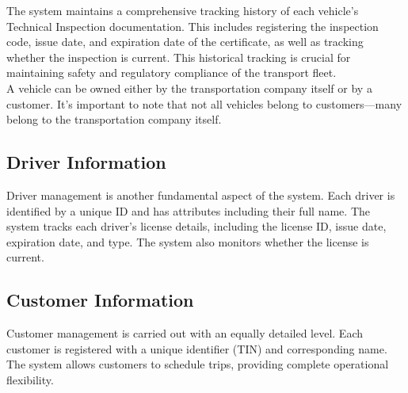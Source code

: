 \documentclass[11pt, a4paper]{article}
\begin{document}
The system maintains a comprehensive tracking history of each vehicle's Technical Inspection documentation. This includes registering the inspection code, issue date, and expiration date of the certificate, as well as tracking whether the inspection is current. This historical tracking is crucial for maintaining safety and regulatory compliance of the transport fleet.\\

A vehicle can be owned either by the transportation company itself or by a customer. It's important to note that not all vehicles belong to customers—many belong to the transportation company itself.\\

\subsection*{Driver Information}
Driver management is another fundamental aspect of the system. Each driver is identified by a unique ID and has attributes including their full name. The system tracks each driver's license details, including the license ID, issue date, expiration date, and type. The system also monitors whether the license is current.\\

\subsection*{Customer Information}
Customer management is carried out with an equally detailed level. Each customer is registered with a unique identifier (TIN) and corresponding name. The system allows customers to schedule trips, providing complete operational flexibility.\\

\newpage

\end{document}
